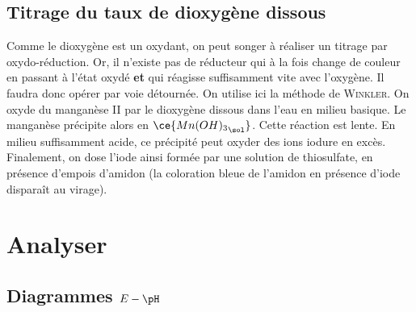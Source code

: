 \documentclass[../main/main.tex]{subfiles}
\begin{document}
{	\subsection{Titrage du taux de dioxygène dissous}
	Comme le dioxygène est un oxydant, on peut songer à réaliser un titrage par
	oxydo-réduction. Or, il n'existe pas de réducteur qui à la fois change de
	couleur en passant à l'état oxydé \textbf{et} qui réagisse suffisamment vite
	avec l'oxygène. Il faudra donc opérer par voie détournée. On utilise ici la
	méthode de \textsc{Winkler}.
	\bigbreak
	On oxyde du manganèse II par le dioxygène dissous  dans l'eau en milieu
	basique. Le manganèse précipite alors en $\ce{{Mn(OH)_3}_{\sol}}$. Cette
	réaction est lente. En milieu suffisamment acide, ce précipité peut oxyder des
	ions iodure en excès. Finalement, on dose l'iode ainsi formée par une solution
	de thiosulfate, en présence d'empois d'amidon (la coloration bleue de l'amidon
	en présence d'iode disparaît au virage).
}

\setcounter{section}{2}
\section{Analyser}
\subsection{Diagrammes $E-\pH$}
%

%
%
\end{document}
